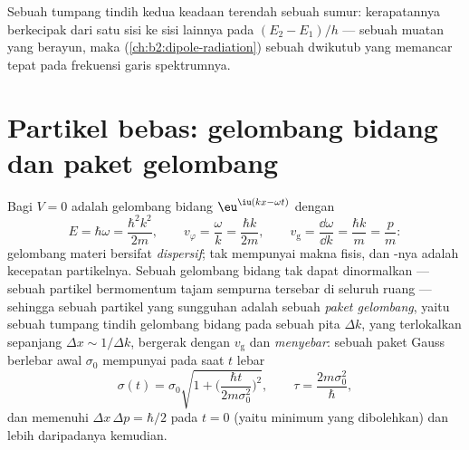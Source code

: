 \begin{omfigure}

{\small Sebuah tumpang tindih kedua keadaan terendah sebuah sumur:
kerapatannya berkecipak dari satu sisi ke sisi lainnya pada 
$(E_2 - E_1)/h$ --- sebuah muatan yang berayun, maka (\cref{ch:b2:dipole-radiation})
sebuah dwikutub yang memancar tepat pada frekuensi garis spektrumnya.}
\end{omfigure}

\section{Partikel bebas: gelombang bidang dan paket gelombang}

\begin{proposition}\label{prop:b2:schrodinger-wave-functions:free}
Bagi $V = 0$  adalah gelombang bidang $\eu^{\iu(kx -
\omega t)}$ dengan
\[
E = \hbar\omega = \frac{\hbar^2k^2}{2m}, \qquad
v_\varphi = \frac{\omega}{k} = \frac{\hbar k}{2m}, \qquad
v_{\text{g}} = \frac{\dd\omega}{\dd k} = \frac{\hbar k}{m} = \frac{p}{m} :
\]
gelombang materi bersifat \emph{dispersif};  tak mempunyai
makna fisis, dan \emph{}-nya adalah kecepatan partikelnya. Sebuah gelombang
bidang tak dapat dinormalkan --- sebuah partikel bermomentum tajam sempurna
tersebar di seluruh ruang --- sehingga sebuah partikel yang sungguhan adalah sebuah \emph{paket
gelombang}, yaitu sebuah tumpang tindih gelombang bidang pada sebuah pita
$\Delta k$, yang terlokalkan sepanjang $\Delta x \sim 1/\Delta k$, bergerak dengan $v_{\text{g}}$ dan
\emph{menyebar}: sebuah paket Gauss berlebar awal $\sigma_0$ mempunyai pada
saat $t$ lebar
\[
\sigma(t) = \sigma_0\sqrt{1 + \Big(\frac{\hbar t}{2m\sigma_0^2}\Big)^2}, \qquad
\tau = \frac{2m\sigma_0^2}{\hbar} ,
\]
dan memenuhi $\Delta x\,\Delta p = \hbar/2$ pada $t = 0$ (yaitu minimum yang dibolehkan)
dan lebih daripadanya kemudian.
\end{proposition}

